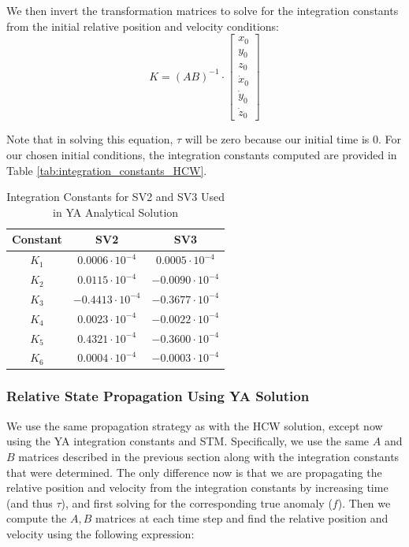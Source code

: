 We then invert the transformation matrices to solve for the integration constants from the initial relative position and velocity conditions:
\[
K = (A B)^{-1} \cdot \begin{bmatrix}
x_0 \\ y_0 \\ z_0 \\ \dot{x}_0 \\ \dot{y}_0 \\ \dot{z}_0
\end{bmatrix}
\]

Note that in solving this equation, $\tau$ will be zero because our initial time is 0. For our chosen initial conditions, the integration constants computed are provided in Table \ref{tab:integration_constants_HCW}.

\begin{table}[ht]
    \centering
    \renewcommand{\arraystretch}{1.2}
    \begin{tabular}{c c c}
        \toprule
        \textbf{Constant} & \textbf{SV2} & \textbf{SV3} \\
        \midrule
        $K_1$ & $0.0006\cdot10^{-4}$ & $0.0005\cdot10^{-4}$ \\
        $K_2$ & $0.0115\cdot10^{-4}$ & $-0.0090\cdot10^{-4}$ \\
        $K_3$ & $-0.4413\cdot10^{-4}$& $-0.3677\cdot10^{-4}$\\
        $K_4$ & $0.0023\cdot10^{-4}$ & $-0.0022\cdot10^{-4}$ \\
        $K_5$ & $0.4321\cdot10^{-4}$ & $-0.3600\cdot10^{-4}$ \\
        $K_6$ & $0.0004\cdot10^{-4}$ & $-0.0003\cdot10^{-4}$ \\
        \bottomrule
    \end{tabular}
    \caption{Integration Constants for SV2 and SV3 Used in YA Analytical Solution}
    \label{tab:integration_constants_YA}
\end{table}

\subsubsection{Relative State Propagation Using YA Solution}
We use the same propagation strategy as with the HCW solution, except now using the YA integration constants and STM. Specifically, we use the same $A$ and $B$ matrices described in the previous section along with the integration constants that were determined. The only difference now is that we are propagating the relative position and velocity from the integration constants by increasing time (and thus $\tau$), and first solving for the corresponding true anomaly ($f$). Then we compute the $A, B$ matrices at each time step and find the relative position and velocity using the following expression:

